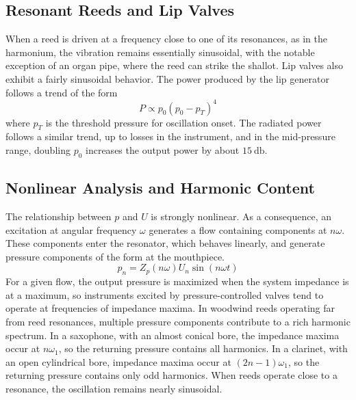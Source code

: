 \subsection{Resonant Reeds and Lip Valves}

When a reed is driven at a frequency close to one of its resonances, as in the harmonium, the vibration remains essentially sinusoidal, with the notable exception of an organ pipe, where the reed can strike the shallot. Lip valves also exhibit a fairly sinusoidal behavior. The power produced by the lip generator follows a trend of the form
\[
P \propto p_{0}(p_{0} - p_{T})^{4}
\]
where \( p_{T} \) is the threshold pressure for oscillation onset. The radiated power follows a similar trend, up to losses in the instrument, and in the mid-pressure range, doubling \( p_{0} \) increases the output power by about \( \SI{15}{\decibel} \).

\subsection{Nonlinear Analysis and Harmonic Content}

The relationship between \( p \) and \( U \) is strongly nonlinear. As a consequence, an excitation at angular frequency \( \omega \) generates a flow containing components at \( n\omega \). These components enter the resonator, which behaves linearly, and generate pressure components of the form at the mouthpiece.
\[
p_{n} = Z_{p}(n\omega)U_{n}\sin(n\omega t)
\]
For a given flow, the output pressure is maximized when the system impedance is at a maximum, so instruments excited by pressure-controlled valves tend to operate at frequencies of impedance maxima. In woodwind reeds operating far from reed resonances, multiple pressure components contribute to a rich harmonic spectrum. In a saxophone, with an almost conical bore, the impedance maxima occur at \( n\omega_{1} \), so the returning pressure contains all harmonics. In a clarinet, with an open cylindrical bore, impedance maxima occur at \( (2n-1)\omega_{1} \), so the returning pressure contains only odd harmonics. When reeds operate close to a resonance, the oscillation remains nearly sinusoidal.
